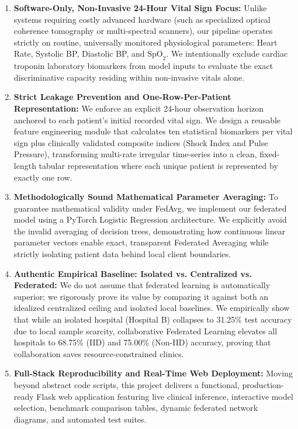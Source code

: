 \begin{enumerate}
    \item \textbf{Software-Only, Non-Invasive 24-Hour Vital Sign Focus:} Unlike systems requiring costly advanced hardware (such as specialized optical coherence tomography or multi-spectral scanners), our pipeline operates strictly on routine, universally monitored physiological parameters: Heart Rate, Systolic BP, Diastolic BP, and $\text{SpO}_2$. We intentionally exclude cardiac troponin laboratory biomarkers from model inputs to evaluate the exact discriminative capacity residing within non-invasive vitals alone.
    
    \item \textbf{Strict Leakage Prevention and One-Row-Per-Patient Representation:} We enforce an explicit 24-hour observation horizon anchored to each patient's initial recorded vital sign. We design a reusable feature engineering module that calculates ten statistical biomarkers per vital sign plus clinically validated composite indices (Shock Index and Pulse Pressure), transforming multi-rate irregular time-series into a clean, fixed-length tabular representation where each unique patient is represented by exactly one row.
    
    \item \textbf{Methodologically Sound Mathematical Parameter Averaging:} To guarantee mathematical validity under FedAvg, we implement our federated model using a PyTorch Logistic Regression architecture. We explicitly avoid the invalid averaging of decision trees, demonstrating how continuous linear parameter vectors enable exact, transparent Federated Averaging while strictly isolating patient data behind local client boundaries.
    
    \item \textbf{Authentic Empirical Baseline: Isolated vs. Centralized vs. Federated:} We do not assume that federated learning is automatically superior; we rigorously prove its value by comparing it against both an idealized centralized ceiling and isolated local baselines. We empirically show that while an isolated hospital (Hospital B) collapses to 31.25\% test accuracy due to local sample scarcity, collaborative Federated Learning elevates all hospitals to 68.75\% (IID) and 75.00\% (Non-IID) accuracy, proving that collaboration saves resource-constrained clinics.
    
    \item \textbf{Full-Stack Reproducibility and Real-Time Web Deployment:} Moving beyond abstract code scripts, this project delivers a functional, production-ready Flask web application featuring live clinical inference, interactive model selection, benchmark comparison tables, dynamic federated network diagrams, and automated test suites.
\end{enumerate}

